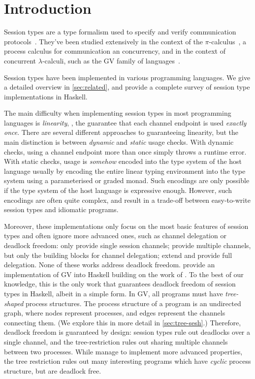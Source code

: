\documentclass[sigplan,screen]{acmart}
\begin{document}
\section{Introduction}\label{sec:introduction}
Session types are a type formalism used to specify and verify communication protocols~\cite{honda93,takeuchihonda94,hondavasconcelos98,hondayoshida08}. They've been studied extensively in the context of the $\pi$-calculus~\cite{sangiorgiwalker01}, a process calculus for communication an concurrency, and in the context of concurrent $\lambda$-calculi, such as the GV family of languages~\cite[``Good Variation'',][]{gayvasconcelos10,wadler14,lindleymorris15,fowlerlindley19}.

Session types have been implemented in various programming languages. We give a detailed overview in \cref{sec:related}, and \citet{orchardyoshida17} provide a complete survey of session type implementations {in Haskell}.

The main difficulty when implementing session types in most programming languages is \emph{linearity}, \ie, the guarantee that each channel endpoint is used \emph{exactly once}. There are several different approaches to guaranteeing linearity, but the main distinction is between \emph{dynamic} \cite{PadFuse,ScalasY16,Scalas2017} and \emph{static} \cite{LM17:fst,pucellatov08,lindleymorris16} usage checks. With dynamic checks, using a channel endpoint more than once simply throws a runtime error. With static checks, usage is \emph{somehow} encoded into the type system of the host language usually by encoding the entire linear typing environment into the type system using a parameterised or graded monad. Such encodings are only possible if the type system of the host language is expressive enough. However, such encodings are often quite complex, and result in a trade-off between easy-to-write session types and idiomatic programs.

Moreover, these implementations only focus on the most basic features of session types and often ignore more advanced ones, such as channel delegation or deadlock freedom: \citet{neubauerthiemann04} only provide single session channels; \citet{pucellatov08} provide multiple channels, but only the building blocks for channel delegation; \citet{imaiyuen10} extend \citet{pucellatov08} and provide full delegation. None of these works address deadlock freedom.
\citet{lindleymorris16} provide an implementation of GV into Haskell building on the work of \citet{polakow15}. To the best of our knowledge, this is the only work that guarantees deadlock freedom of session types in Haskell, albeit in a simple form. In GV, all programs must have \emph{tree-shaped} process structures. The process structure of a program is an undirected graph, where nodes represent processes, and edges represent the channels connecting them. (We explore this in more detail in \cref{sec:tree-sesh}.) Therefore, deadlock freedom is guaranteed by design: session types rule out deadlocks over a single channel, and the tree-restriction rules out sharing multiple channels between two processes. While \citet{lindleymorris16} manage to implement more advanced properties, the tree restriction rules out many interesting programs which have \emph{cyclic} process structure, but are deadlock free.
\end{document}
